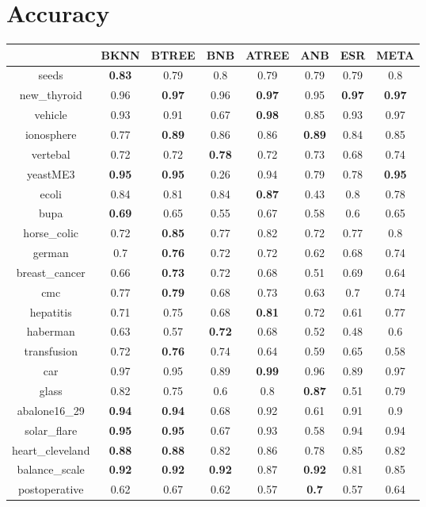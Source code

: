 \documentclass{article}%
\begin{document}
%
\normalsize%
\section*{Accuracy}%
\begin{tabular}{c|ccccccc}%
\hline%
&BKNN&BTREE&BNB&ATREE&ANB&ESR&META\\%
\hline%
seeds&\textbf{0.83}&0.79&0.8&0.79&0.79&0.79&0.8\\%
new\_thyroid&0.96&\textbf{0.97}&0.96&\textbf{0.97}&0.95&\textbf{0.97}&\textbf{0.97}\\%
vehicle&0.93&0.91&0.67&\textbf{0.98}&0.85&0.93&0.97\\%
ionosphere&0.77&\textbf{0.89}&0.86&0.86&\textbf{0.89}&0.84&0.85\\%
vertebal&0.72&0.72&\textbf{0.78}&0.72&0.73&0.68&0.74\\%
yeastME3&\textbf{0.95}&\textbf{0.95}&0.26&0.94&0.79&0.78&\textbf{0.95}\\%
ecoli&0.84&0.81&0.84&\textbf{0.87}&0.43&0.8&0.78\\%
bupa&\textbf{0.69}&0.65&0.55&0.67&0.58&0.6&0.65\\%
horse\_colic&0.72&\textbf{0.85}&0.77&0.82&0.72&0.77&0.8\\%
german&0.7&\textbf{0.76}&0.72&0.72&0.62&0.68&0.74\\%
breast\_cancer&0.66&\textbf{0.73}&0.72&0.68&0.51&0.69&0.64\\%
cmc&0.77&\textbf{0.79}&0.68&0.73&0.63&0.7&0.74\\%
hepatitis&0.71&0.75&0.68&\textbf{0.81}&0.72&0.61&0.77\\%
haberman&0.63&0.57&\textbf{0.72}&0.68&0.52&0.48&0.6\\%
transfusion&0.72&\textbf{0.76}&0.74&0.64&0.59&0.65&0.58\\%
car&0.97&0.95&0.89&\textbf{0.99}&0.96&0.89&0.97\\%
glass&0.82&0.75&0.6&0.8&\textbf{0.87}&0.51&0.79\\%
abalone16\_29&\textbf{0.94}&\textbf{0.94}&0.68&0.92&0.61&0.91&0.9\\%
solar\_flare&\textbf{0.95}&\textbf{0.95}&0.67&0.93&0.58&0.94&0.94\\%
heart\_cleveland&\textbf{0.88}&\textbf{0.88}&0.82&0.86&0.78&0.85&0.82\\%
balance\_scale&\textbf{0.92}&\textbf{0.92}&\textbf{0.92}&0.87&\textbf{0.92}&0.81&0.85\\%
postoperative&0.62&0.67&0.62&0.57&\textbf{0.7}&0.57&0.64\\%
\end{tabular}
\end{document}
